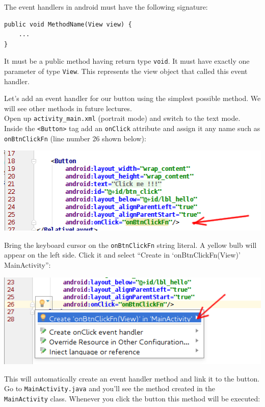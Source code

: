 The event handlers in android must have the following signature:

\begin{verbatim}
public void MethodName(View view) {
    ...
}
\end{verbatim}

It must be a public method having return type \texttt{void}. It must have exactly one parameter of type \texttt{View}. This represents the view object that called this event handler. 

Let's add an event handler for our button using the simplest possible method. We will see other methods in future lectures. \\

Open up \texttt{activity\_main.xml} (portrait mode) and switch to the text mode. Inside the \texttt{<Button>} tag add an \texttt{onClick} attribute and assign it any name such as \texttt{onBtnClickFn} (line number 26 shown below):

\begin{center}
	\includegraphics[scale=0.4]{chapters/ch04/images/48}
\end{center}

Bring the keyboard cursor on the \texttt{onBtnClickFn} string literal. A yellow bulb will appear on the left side. Click it and select ``Create in `onBtnClickFn(View)' MainActivity'':

\begin{center}
	\includegraphics[scale=0.4]{chapters/ch04/images/49}
\end{center}

This will automatically create an event handler method and link it to the button. Go to \texttt{MainActivity.java} and you'll see the method created in the \texttt{MainActivity} class. Whenever you click the button this method will be executed:

